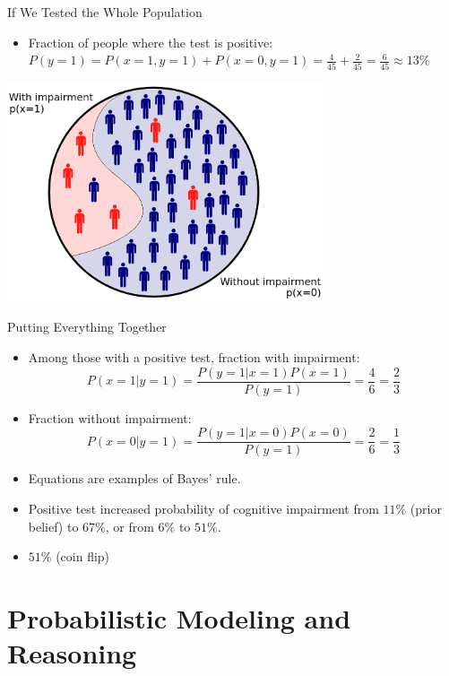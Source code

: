 \documentclass{beamer}
\begin{document}
\begin{frame}{If We Tested the Whole Population}
  \begin{itemize}
    \item Fraction of people where the test is positive:
      \(
        P(y=1) = P(x=1, y=1) + P(x=0, y=1) = \frac{4}{45} + \frac{2}{45} = \frac{6}{45} \approx 13\%
      \)
  \end{itemize}
  \begin{center}
    \includegraphics[width=0.7\textwidth]{whole_population.png}
  \end{center}
\end{frame}



\begin{frame}{Putting Everything Together}
\begin{itemize}
  \item Among those with a positive test, fraction with impairment:
  \[
  P(x = 1|y = 1) = \frac{P(y = 1|x = 1)P(x = 1)}{P(y = 1)} = \frac{4}{6} = \frac{2}{3}
  \]
  \item Fraction without impairment:
  \[
  P(x = 0|y = 1) = \frac{P(y = 1|x = 0)P(x = 0)}{P(y = 1)} = \frac{2}{6} = \frac{1}{3}
  \]
  \item Equations are examples of Bayes' rule.
  \item Positive test increased probability of cognitive impairment from $11\%$ (prior belief) to $67\%$, or from $6\%$ to $51\%$.
  \item $51\%$ (coin flip)
\end{itemize}
\end{frame}

\section{Probabilistic Modeling and Reasoning}
\end{document}
